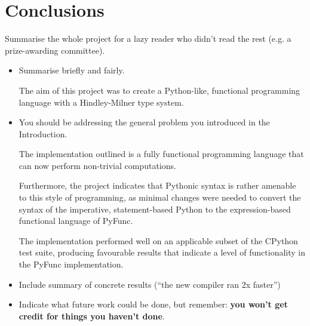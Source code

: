 \documentclass{l4proj}
\begin{document}




\chapter{Conclusions}    
Summarise the whole project for a lazy reader who didn't read the rest (e.g. a prize-awarding committee).
\begin{itemize}
    \item
        Summarise briefly and fairly.

        The aim of this project was to create a Python-like, functional programming language with a Hindley-Milner type system.
    \item
        You should be addressing the general problem you introduced in the
        Introduction. 
        
        The implementation outlined is a fully functional programming language that can now perform non-trivial computations.

        Furthermore, the project indicates that Pythonic syntax is rather amenable to this style of programming, as minimal changes were needed to convert the syntax of the imperative, statement-based Python to the expression-based functional language of PyFunc.

        The implementation performed well on an applicable subset of the CPython test suite, producing favourable results that indicate a level of functionality in the PyFunc implementation.

    \item
        Include summary of concrete results (``the new compiler ran 2x
        faster'')
    \item
        Indicate what future work could be done, but remember: \textbf{you
        won't get credit for things you haven't done}.
\end{itemize}

%
% 
\end{document}
